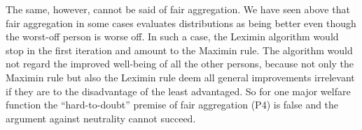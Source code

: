 The same, however, cannot be said of fair aggregation. We have seen above that fair aggregation in some cases evaluates distributions as being better even though the worst-off person is worse off. In such a case, the Leximin algorithm would stop in the first iteration and amount to the Maximin rule. The algorithm would not regard the improved well-being of all the other persons, because not only the Maximin rule but also the Leximin rule deem all general improvements irrelevant if they are to the disadvantage of the least advantaged. So for one major welfare function the “hard-to-doubt” premise of fair aggregation (P4) is false and the argument against neutrality cannot succeed.  
